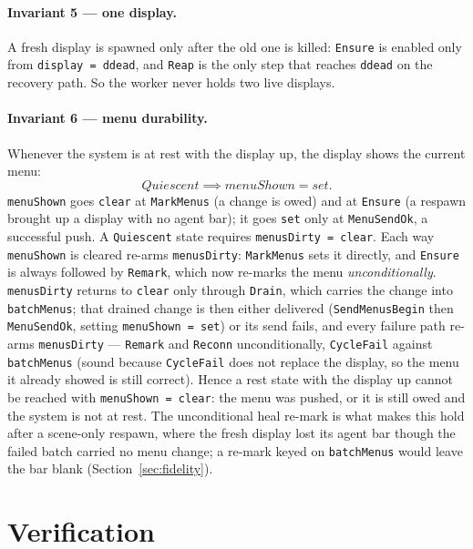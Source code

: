 \documentclass[a4paper,10pt,fleqn]{article}
\begin{document}
\paragraph{Invariant 5 --- one display.}
A fresh display is spawned only after the old one is killed:
\texttt{Ensure} is enabled only from \texttt{display = ddead}, and
\texttt{Reap} is the only step that reaches \texttt{ddead} on the recovery
path.  So the worker never holds two live displays.

\paragraph{Invariant 6 --- menu durability.}
Whenever the system is at rest with the display up, the display shows the
current menu:
\[
  Quiescent \implies menuShown = set.
\]
\texttt{menuShown} goes \texttt{clear} at \texttt{MarkMenus} (a change is owed)
and at \texttt{Ensure} (a respawn brought up a display with no agent bar); it
goes \texttt{set} only at \texttt{MenuSendOk}, a successful push.  A
\texttt{Quiescent} state requires \texttt{menusDirty = clear}.  Each way
\texttt{menuShown} is cleared re-arms \texttt{menusDirty}: \texttt{MarkMenus}
sets it directly, and \texttt{Ensure} is always followed by \texttt{Remark},
which now re-marks the menu \emph{unconditionally}.  \texttt{menusDirty}
returns to \texttt{clear} only through \texttt{Drain}, which carries the change
into \texttt{batchMenus}; that drained change is then either delivered
(\texttt{SendMenusBegin} then \texttt{MenuSendOk}, setting \texttt{menuShown =
set}) or its send fails, and every failure path re-arms \texttt{menusDirty} ---
\texttt{Remark} and \texttt{Reconn} unconditionally, \texttt{CycleFail} against
\texttt{batchMenus} (sound because \texttt{CycleFail} does not replace the
display, so the menu it already showed is still correct).  Hence a rest state
with the display up cannot be reached with \texttt{menuShown = clear}: the menu
was pushed, or it is still owed and the system is not at rest.  The
unconditional heal re-mark is what makes this hold after a scene-only respawn,
where the fresh display lost its agent bar though the failed batch carried no
menu change; a re-mark keyed on \texttt{batchMenus} would leave the bar blank
(Section~\ref{sec:fidelity}).

\section{Verification}
\label{sec:verify}
\end{document}
